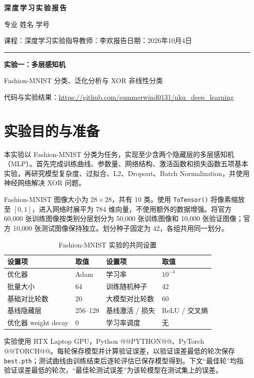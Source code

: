 \documentclass[UTF8,11pt,a4paper,fontset=fandol]{ctexart}
\newcommand{\reportname}{实验一：多层感知机}
\newcommand{\studentname}{史峰源}
\newcommand{\studentnumber}{2412526}
\newcommand{\studentmajor}{智能科学与技术}
\newcommand{\teachername}{李欢}
\begin{document}
\thispagestyle{empty}
\begin{center}
  {\LARGE\bfseries 深\,度\,学\,习\,实\,验\,报\,告}\par\vspace{0.6em}
  专业\underline{\makebox[9em]{\studentmajor}}\quad
  姓名\underline{\makebox[5em]{\studentname}}\quad
  学号\underline{\makebox[6em]{\studentnumber}}\par\vspace{0.35em}
  课程：深度学习实验\qquad 指导教师：\teachername\qquad 报告日期：2026年10月4日\par
  \vspace{0.2em}\rule{\textwidth}{1.2pt}\par\vspace{0.5em}
  {\Large\bfseries\reportname}\par
  {\normalsize Fashion-MNIST 分类、泛化分析与 XOR 非线性分类}
  \par\vspace{0.5em}
  {\small 代码与实验结果：\url{https://github.com/summerwind0131/nku_deep_learning}}
\end{center}

\section{实验目的与准备}
本实验以 Fashion-MNIST 分类为任务，实现至少含两个隐藏层的多层感知机（MLP）。首先完成训练曲线、参数量、网络结构、激活函数和损失函数五项基本实验，再研究模型复杂度、过拟合、L2、Dropout、Batch Normalization，并使用神经网络解决 XOR 问题。

Fashion-MNIST 图像大小为 $28\times28$，共有 10 类。使用 \texttt{ToTensor()} 将像素缩放至 $[0,1]$，进入网络时展平为 784 维向量，不使用额外的数据增强。将官方 60,000 张训练图像按类别分层划分为 50,000 张训练图像和 10,000 张验证图像；官方 10,000 张测试图像保持独立。划分种子固定为 42，各组共用同一划分。

\begin{table}[H]\centering\small
\caption{Fashion-MNIST 实验的共同设置}
\begin{tabular}{llll}\toprule
设置项 & 取值 & 设置项 & 取值 \\\midrule
优化器 & Adam & 学习率 & $10^{-3}$ \\
批量大小 & 64 & 训练随机种子 & 42 \\
基础对比轮数 & 20 & 大模型对比轮数 & 60 \\
基线隐藏层 & 256--128 & 基线激活 / 损失 & ReLU / 交叉熵 \\
优化器 weight decay & 0 & 学习率调度 & 无 \\
\bottomrule\end{tabular}
\end{table}
实验使用 RTX Laptop GPU，Python @@PYTHON@@、PyTorch @@TORCH@@。每轮保存模型并计算验证误差，以验证误差最低的轮次保存 \texttt{best.pth}；测试曲线由训练结束后逐轮评估已保存模型得到。下文“最佳轮”均指验证误差最低的轮次，“最佳轮测试误差”为该轮模型在测试集上的误差。
\end{document}

